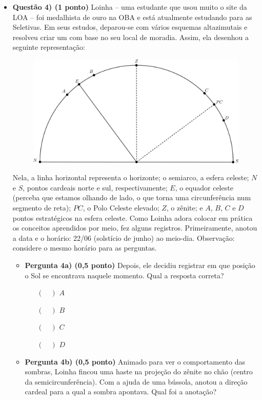 \documentclass[a4paper, 12pt]{article}
\begin{document}
\begin{flushleft}
\begin{itemize}
		\item \textbf{Questão 4) (1 ponto)} Loinha -- uma estudante que usou muito o site da LOA -- foi medalhista de ouro na OBA e está atualmente estudando para as Seletivas. Em seus estudos, deparou-se com vários esquemas altazimutais e resolveu criar um com base no seu local de moradia. Assim, ela desenhou a seguinte representação:
			\begin{figure}[H]
				\centering
				\includegraphics[scale=1.2]{./img/4.png}
			\end{figure}
			Nela, a linha horizontal representa o horizonte; o semiarco, a esfera celeste; $N$ e $S$, pontos cardeais norte e sul, respectivamente; $E$, o equador celeste (perceba que estamos olhando de lado, o que torna uma circunferência num segmento de reta); $PC$, o Polo Celeste elevado; $Z$, o zênite; e $A$, $B$, $C$ e $D$ pontos estratégicos na esfera celeste. \linebreak
			Como Loinha adora colocar em prática os conceitos aprendidos por meio, fez alguns registros. Primeiramente, anotou a data e o horário: 22/06 (solstício de junho) ao meio-dia.\linebreak
			Observação: considere o mesmo horário para as perguntas.
			\begin{itemize}
				\item \textbf{Pergunta 4a) (0,5 ponto)} Depois, ele decidiu registrar em que posição o Sol se encontrava naquele momento. Qual a resposta correta?
					\begin{itemize}
						\item[$(\quad)$] $A$
						\item[$(\quad)$] $B$
						\item[$(\quad)$] $C$
						\item[$(\quad)$] $D$
					\end{itemize}
				\item \textbf{Pergunta 4b) (0,5 ponto)} Animado para ver o comportamento das sombras, Loinha fincou uma haste na projeção do zênite no chão (centro da semicircunferência). Com a ajuda de uma bússola, anotou a direção cardeal para a qual a sombra apontava. Qual foi a anotação?

\end{itemize}
\end{itemize}
\end{flushleft}
\end{document}
